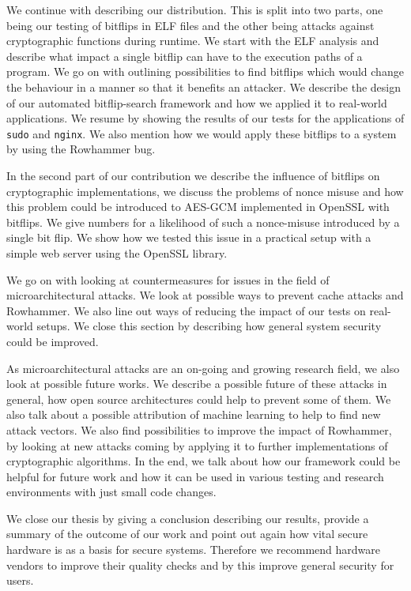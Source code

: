 We continue with describing our distribution. This is split into two parts, one
being our testing of bitflips in ELF files and the other being attacks against
cryptographic functions during runtime. We start with the ELF analysis and
describe what impact a single bitflip can have to the execution paths of a
program. We go on with outlining possibilities to find bitflips which would
change the behaviour in a manner so that it benefits an attacker. We describe
the design of our automated bitflip-search framework and how we applied it to
real-world applications. We resume by showing the results of our tests for
the applications of \texttt{sudo} and \texttt{nginx}. We also mention how we
would apply these bitflips to a system by using the Rowhammer bug.

In the second part of our contribution we describe the influence of bitflips on
cryptographic implementations, we discuss the problems of nonce misuse and how
this problem could be introduced to AES-GCM implemented in OpenSSL with
bitflips. We give numbers for a likelihood of such a nonce-misuse introduced by
a single bit flip. We show how we tested this issue in a practical setup with a
simple web server using the OpenSSL library.

We go on with looking at countermeasures for issues in the field of
microarchitectural attacks. We look at possible ways to prevent cache attacks
and Rowhammer. We also line out ways of reducing the impact of our tests on
real-world setups. We close this section by describing how general system
security could be improved.

As microarchitectural attacks are an on-going and growing research field, we
also look at possible future works. We describe a possible future of these
attacks in general, how open source architectures could help to prevent some of
them. We also talk about a possible attribution of machine learning to help to
find new attack vectors. We also find possibilities to improve the impact of
Rowhammer, by looking at new attacks coming by applying it to further
implementations of cryptographic algorithms. In the end, we talk about how our
framework could be helpful for future work and how it can be used in various
testing and research environments with just small code changes.

We close our thesis by giving a conclusion describing our results, provide a
summary of the outcome of our work and point out again how vital secure hardware
is as a basis for secure systems. Therefore we recommend hardware vendors to
improve their quality checks and by this improve general security for users.

